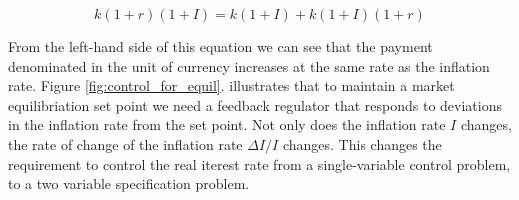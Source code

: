 \[
     k(1+r)(1+I) = k(1+I) + k(1+I)(1+r)
 \]

From the left-hand side of this equation we can see that the payment denominated in the unit of
currency increases at the same rate as the inflation rate. Figure \ref{fig:control_for_equil}.
illustrates that to maintain a market equilibriation set point we need a feedback regulator that
responds to deviations in the inflation rate from the set point.  Not only does the inflation rate
$I$ changes, the rate of change of the  inflation rate $ \Delta I / I $ changes. This
changes the requirement to control the real iterest rate from a single-variable control problem, to
a two variable specification problem.




